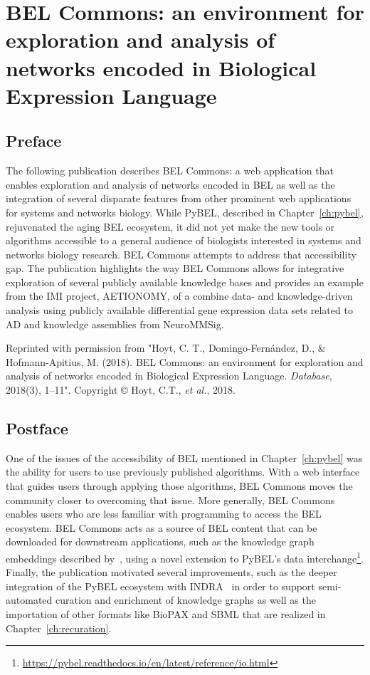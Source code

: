 \chapter{BEL Commons: an environment for exploration and analysis of networks encoded in Biological Expression Language}\label{ch:belcommons}

\section*{Preface}

The following publication describes BEL Commons: a web application that enables exploration and analysis of networks encoded in \ac{BEL} as well as the integration of several disparate features from other prominent web applications for systems and networks biology.
While PyBEL, described in Chapter~\ref{ch:pybel}, rejuvenated the aging \ac{BEL} ecosystem, it did not yet make the new tools or algorithms accessible to a general audience of biologists interested in systems and networks biology research.
BEL Commons attempts to address that accessibility gap.
The publication highlights the way BEL Commons allows for integrative exploration of several publicly available knowledge bases and provides an example from the \ac{IMI} project, AETIONOMY, of a combine data- and knowledge-driven analysis using publicly available differential gene expression data sets related to \ac{AD} and knowledge assemblies from NeuroMMSig\cite{Domingo-Fernandez2017}.

\vspace*{\fill}

Reprinted with permission from "Hoyt, C. T., Domingo-Fern\'{a}ndez, D., \& Hofmann-Apitius, M. (2018). BEL Commons: an environment for exploration and analysis of networks encoded in Biological Expression Language. \textit{Database}, 2018(3), 1–11".
Copyright © Hoyt, C.T., \textit{et al.}, 2018.



\section*{Postface}

One of the issues of the accessibility of \ac{BEL} mentioned in Chapter~\ref{ch:pybel} was the ability for users to use previously published algorithms.
With a web interface that guides users through applying those algorithms, BEL Commons moves the community closer to overcoming that issue.
More generally, BEL Commons enables users who are less familiar with programming to access the \ac{BEL} ecosystem.
BEL Commons acts as a source of BEL content that can be downloaded for downstream applications, such as the knowledge graph embeddings described by~\cite{Ali2019}, using a novel extension to PyBEL's data interchange\footnote{\url{https://pybel.readthedocs.io/en/latest/reference/io.html}}.
Finally, the publication motivated several improvements, such as the deeper integration of the PyBEL ecosystem with \ac{INDRA}~\cite{Gyori2017} in order to support semi-automated curation and enrichment of knowledge graphs as well as the importation of other formats like \ac{BioPAX} and \ac{SBML} that are realized in Chapter~\ref{ch:recuration}.

